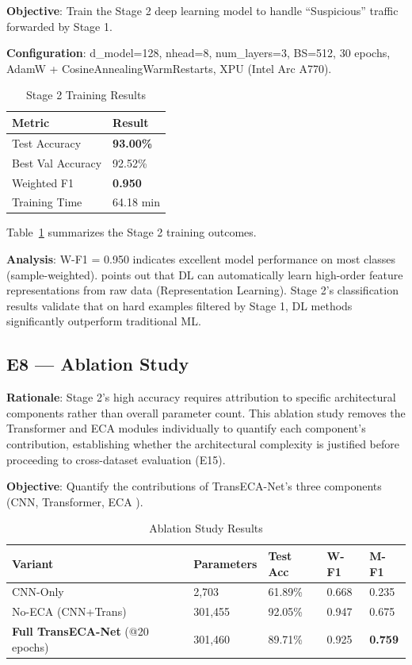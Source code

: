 \documentclass[sigconf]{acmart}
\begin{document}
\textbf{Objective}: Train the Stage 2 deep learning model to handle ``Suspicious'' traffic forwarded by Stage 1.

\textbf{Configuration}: d\_model=128, nhead=8, num\_layers=3, BS=512, 30 epochs, AdamW + CosineAnnealingWarmRestarts, XPU (Intel Arc A770).

\begin{table}[!h]
\caption{Stage 2 Training Results}
\label{tab:s2_results}
\begin{tabular}{ll}
\toprule
\textbf{Metric} & \textbf{Result} \\
\midrule
Test Accuracy & \textbf{93.00\%} \\
Best Val Accuracy & 92.52\% \\
Weighted F1 & \textbf{0.950} \\
Training Time & 64.18 min \\
\bottomrule
\end{tabular}
\end{table}

\noindent Table~\ref{tab:s2_results} summarizes the Stage 2 training outcomes.

\textbf{Analysis}: W-F1 = 0.950 indicates excellent model performance on most classes (sample-weighted). \cite{5} points out that DL can automatically learn high-order feature representations from raw data (Representation Learning). Stage 2's classification results validate that on hard examples filtered by Stage 1, DL methods significantly outperform traditional ML.

\subsection{E8 --- Ablation Study}
\textbf{Rationale}: Stage 2's high accuracy requires attribution to specific architectural components rather than overall parameter count. This ablation study removes the Transformer and ECA modules individually to quantify each component's contribution, establishing whether the architectural complexity is justified before proceeding to cross-dataset evaluation (E15).

\textbf{Objective}: Quantify the contributions of TransECA-Net's three components (CNN, Transformer, ECA \cite{18}).


\begin{table}[!t]
\caption{Ablation Study Results}
\label{tab:ablation}
\begin{tabular}{lllll}
\toprule
\textbf{Variant} & \textbf{Parameters} & \textbf{Test Acc} & \textbf{W-F1} & \textbf{M-F1} \\
\midrule
CNN-Only & 2,703 & 61.89\% & 0.668 & 0.235 \\
No-ECA (CNN+Trans) & 301,455 & 92.05\% & 0.947 & 0.675 \\
\textbf{Full TransECA-Net} (@20 epochs) & 301,460 & 89.71\% & 0.925 & \textbf{0.759} \\
\bottomrule
\end{tabular}
\end{table}
\end{document}
